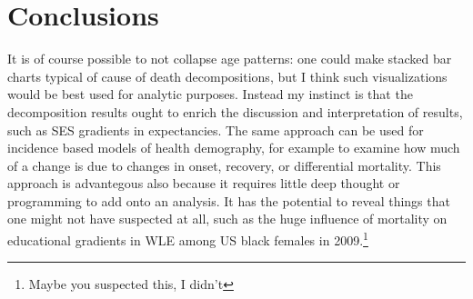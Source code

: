 \documentclass{article}
\begin{document}
\section{Conclusions}
It is of course possible to not collapse age patterns: one could make stacked
bar charts typical of cause of death decompositions, but I think such
visualizations would be best used for analytic purposes. Instead my instinct is
that the decomposition results ought to enrich the discussion and interpretation
of results, such as SES gradients in expectancies. The same approach can be used
for incidence based models of health demography, for example to examine how much
of a change is due to changes in onset, recovery, or differential mortality.
This approach is advantegous also because it requires little deep thought or
programming to add onto an analysis. It has the potential to reveal things that
one might not have suspected at all, such as the huge influence of mortality on
educational gradients in WLE among US black females in 2009.\footnote{Maybe you
suspected this, I didn't}


\singlespacing

   
\end{document}
